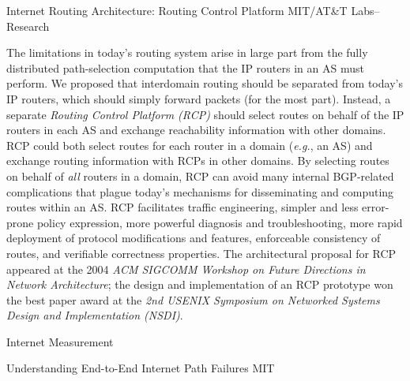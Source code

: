 \documentclass{article}
\newcommand{\eg}{{\em e.g.}}
\begin{document}
\begin{cv}{}
{\mf Internet Routing Architecture: Routing Control Platform} \hfill MIT/AT\&T Labs--Research
\vspace*{-0.1in}

   The limitations in today's routing system arise in large part from
   the fully distributed path-selection computation that the IP routers
   in an AS must perform.  We proposed that interdomain routing should be
   separated from today's IP routers, which should simply forward packets (for
   the most part).  Instead, a separate {\em Routing Control Platform (RCP)}
   should select routes on behalf of the IP routers in each AS and exchange
   reachability information with other domains.  RCP could both select routes
   for each router in a domain (\eg, an AS) and exchange routing information
   with RCPs in other domains.  By selecting routes on behalf of {\em all\/}
   routers in a domain, RCP can avoid many internal BGP-related complications
   that plague today's mechanisms for disseminating and computing routes within
   an AS.  RCP facilitates traffic engineering, simpler and less error-prone
   policy expression, more powerful diagnosis and troubleshooting, more rapid
   deployment of protocol modifications and features, enforceable consistency
   of routes, and verifiable correctness properties.  The architectural
   proposal for RCP appeared at the 2004 {\em ACM SIGCOMM Workshop on Future
   Directions in Network Architecture}; the design and implementation of an RCP
   prototype won the best paper award at the {\em 2nd USENIX Symposium
   on Networked Systems Design and Implementation (NSDI)}.


\pagebreak
{\df Internet Measurement}

{\mf Understanding End-to-End Internet Path Failures} \hfill MIT
\vspace*{-0.1in}


\end{cv}
\end{document}
